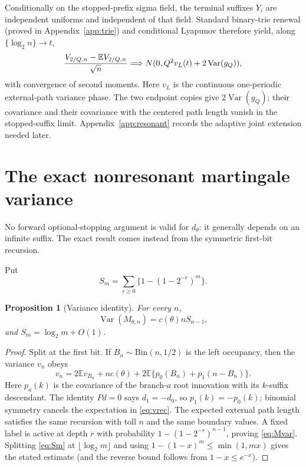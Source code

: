 \documentclass[11pt]{article}
\numberwithin{equation}{section}
\newtheorem{proposition}[theorem]{Proposition}
\theoremstyle{definition}\newtheorem{definition}[theorem]{Definition}
\theoremstyle{remark}\newtheorem{remark}[theorem]{Remark}
\newcommand{\E}{\mathbb E}\newcommand{\Pp}{\mathbb P}
\newcommand{\Var}{\operatorname {Var}}\newcommand{\Cov}{\operatorname {Cov}}
\newcommand{\1}{\mathbf 1}\newcommand{\cD}{\mathcal D}
\begin{document}
Conditionally on the stopped-prefix sigma field, the terminal suffixes
$Y_i$ are independent uniforms and independent of that field.  Standard
binary-trie renewal (proved in Appendix~\ref{app:trie}) and conditional
Lyapunov therefore yield, along $\{\log_2n\}\to t$,
\begin{equation}
 {V_{2/Q,n}-\E V_{2/Q,n}\over\sqrt n}\Longrightarrow
 N(0,Q^2v_L(t)+2\Var(g_Q)),                                \label{eq:resVclt}
\end{equation}
with convergence of second moments.  Here $v_L$ is the continuous
one-periodic external-path variance phase.  The two endpoint copies give
$2\Var(g_Q)$; their covariance and their covariance with the centered path
length vanish in the stopped-suffix limit.  Appendix~\ref{app:resonant}
records the adaptive joint extension needed later.

\clearpage
\section{The exact nonresonant martingale variance}\label{sec:Mvar}
No forward optional-stopping argument is valid for $d_\theta$: it generally
depends on an infinite suffix.  The exact result comes instead from the
symmetric first-bit recursion.

Put
\begin{equation}S_m=\sum_{r\ge0}\{1-(1-2^{-r})^m\}.             \label{eq:Sm}
\end{equation}
\begin{proposition}[Variance identity]\label{prop:Mvar}
For every $n$,
\begin{equation}\Var(M_{\theta,n})=c(\theta)nS_{n-1},          \label{eq:Mvar}
\end{equation}
and $S_m=\log_2m+O(1)$.
\end{proposition}
\begin{proof}
Split at the first bit.  If $B_n\sim\mathrm{Bin}(n,1/2)$ is the left
occupancy, then the variance $v_n$ obeys
\begin{equation}v_n=2\E v_{B_n}+nc(\theta)+2\E\{p_0(B_n)+p_1(n-B_n)\}.
                                                                  \label{eq:vrec}
\end{equation}
Here $p_a(k)$ is the covariance of the branch-$a$ root innovation with its
$k$-suffix descendant.  The identity $Pd=0$ says $d_1=-d_0$, so
$p_1(k)=-p_0(k)$; binomial symmetry cancels the expectation in
\eqref{eq:vrec}.  The expected external path length satisfies the same
recursion with toll $n$ and the same boundary values.  A fixed label is
active at depth $r$ with probability $1-(1-2^{-r})^{n-1}$, proving
\eqref{eq:Mvar}.  Splitting \eqref{eq:Sm} at $\lfloor\log_2m\rfloor$ and
using $1-(1-x)^m\le\min(1,mx)$ gives the stated estimate (and the reverse
bound follows from $1-x\le e^{-x}$).
\end{proof}
\end{document}

